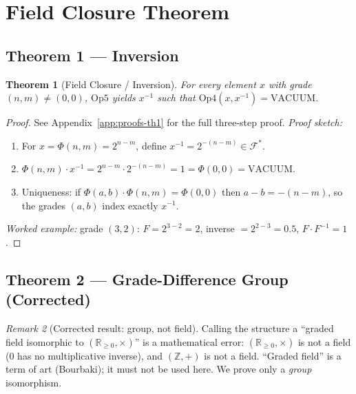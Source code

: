 \documentclass[12pt,a4paper]{article}
\theoremstyle{plain}
\newtheorem{theorem}{Theorem}[section]
\theoremstyle{definition}
\theoremstyle{remark}
\newtheorem{remark}[theorem]{Remark}
\begin{document}
\section{Field Closure Theorem}
\label{sec:field-closure}

\subsection{Theorem 1 --- Inversion}

\begin{theorem}[Field Closure / Inversion]
\label{thm:inversion}
For every element $x$ with grade $(n,m) \neq (0,0)$, $\mathrm{Op5}$ yields
$x^{-1}$ such that $\mathrm{Op4}(x,x^{-1}) = \mathrm{VACUUM}$.
\end{theorem}
\begin{proof}
See Appendix~\ref{app:proofs-th1} for the full three-step proof.
\emph{Proof sketch:}
\begin{enumerate}[nosep]
  \item For $x = \Phi(n,m) = 2^{n-m}$, define $x^{-1} = 2^{-(n-m)} \in \mathcal{F}^*$.
  \item $\Phi(n,m)\cdot x^{-1} = 2^{n-m}\cdot 2^{-(n-m)} = 1 = \Phi(0,0) =
        \mathrm{VACUUM}$.
  \item Uniqueness: if $\Phi(a,b)\cdot \Phi(n,m)=\Phi(0,0)$ then $a-b=-(n-m)$, so
        the grades $(a,b)$ index exactly $x^{-1}$.
\end{enumerate}
\emph{Worked example:} grade $(3,2)$: $F = 2^{3-2} = 2$, inverse $= 2^{2-3}
= 0.5$, $F \cdot F^{-1} = 1$.\quad\checkmark
\end{proof}

\subsection{Theorem 2 --- Grade-Difference Group (Corrected)}

\begin{remark}[Corrected result: group, not field]\label{rem:no-field}
Calling the structure a ``graded field isomorphic to $(\mathbb{R}_{\geq 0},
\times)$'' is a mathematical error: $(\mathbb{R}_{\geq 0},\times)$ is not a
field (0 has no multiplicative inverse), and $(\mathbb{Z},+)$ is not a field.
``Graded field'' is a term of art (Bourbaki); it must not be used here.
We prove only a \emph{group} isomorphism.
\end{remark}
\end{document}
